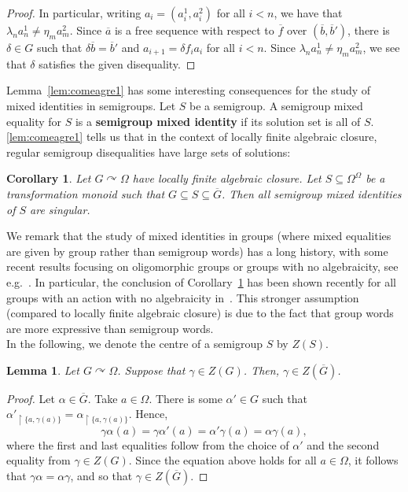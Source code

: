 \documentclass{article}
\newtheorem{corollary}[theorem]{Corollary}
\newtheorem{lemma}[theorem]{Lemma}
\theoremstyle{remark}
\theoremstyle{definition}
\def\acts{\curvearrowright}
\def\G{\overline{G}}
\def\a{\overline{a}}
\def\b{\overline{b}}
\def\f{\overline{f}}
\begin{document}
{{{{{\begin{proof}
{In particular, writing $a_i=(a_i^1,a_i^2)$ for all $i<n$, we have that %
$\lambda_n a^1_n\neq \eta_ma_m^2$.} %
{Since $\a$ is a free sequence with respect to $\f$ over $(\b, \b')$,} there is $\delta\in G$ such that $\delta\b=\b'$ and $a_{i+1}=\delta {f_i}
a_i$ for all $i<n$. Since %
$\lambda_n a^1_n\neq \eta_m a_m^2$, we see that $\delta$ satisfies the given disequality.
\end{proof}



Lemma~\ref{lem:comeagre1} has some interesting consequences for the study of mixed identities in semigroups. Let $S$ be a semigroup. A semigroup mixed equality for $S$ is a \textbf{semigroup mixed identity} if its solution set is all of $S$.  \cref{lem:comeagre1} tells us that %
in the context of locally finite algebraic closure, regular semigroup {disequalities} have large sets of solutions:

\begin{corollary}\label{cor:mixedidentitiessingular} Let $G\acts\Omega$ have locally finite algebraic closure. Let $S\subseteq \Omega^\Omega$ be a transformation monoid such that $G\subseteq S\subseteq \overline{G}$. Then all semigroup mixed identities of $S$ are singular.
\end{corollary}
{We remark that the study of mixed identities in groups (where mixed equalities are given by group rather than semigroup words) has a long history, with some recent results focusing on oligomorphic groups or groups with no algebraicity, see e.g.~\cite{bodirsky2025mixed,etedadialiabadi2021dense,slanina2019laws, marimon2026all}. In particular, the conclusion of Corollary~\ref{cor:mixedidentitiessingular} has been shown recently for all groups with an action with no algebraicity in~\cite{marimon2026all}. This stronger assumption (compared to locally finite algebraic closure) is due to the fact that group words are more expressive than semigroup words.}\\

{In the following, we denote the centre of a semigroup $S$ by $Z(S)$.}

\begin{lemma}\label{lem:centretransfer} Let $G\acts\Omega$. Suppose that $\gamma\in Z(G)$. Then, $\gamma\in Z(\G)$. 
\end{lemma}
\begin{proof} Let $\alpha\in \G$. Take $a\in \Omega$. There is some $\alpha'\in G$ such that $\alpha'_{\upharpoonright \{a,\gamma(a)\}}=\alpha_{\upharpoonright \{a,\gamma(a)\}}$. Hence, 
\[\gamma\alpha(a)=\gamma\alpha'(a)=\alpha'\gamma(a)=\alpha\gamma(a),\]
where the first and last equalities follow from the choice of $\alpha'$ and the second equality from $\gamma\in Z(G)$. Since the equation above holds for all $a\in \Omega$, it follows that $\gamma\alpha=\alpha\gamma$, and so that $\gamma\in Z(\G)$.
\end{proof}

}}}}}
\end{document}
